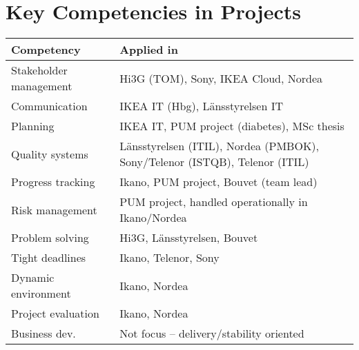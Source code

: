 \section{Key Competencies in Projects}
{\small\sffamily
\begin{tabular}{p{5cm} p{9cm}}
\textbf{Competency} & \textbf{Applied in} \\ \hline
Stakeholder management & Hi3G (TOM), Sony, IKEA Cloud, Nordea \\
Communication & IKEA IT (Hbg), Länsstyrelsen IT \\
Planning & IKEA IT, PUM project (diabetes), MSc thesis \\
Quality systems & Länsstyrelsen (ITIL), Nordea (PMBOK), Sony/Telenor (ISTQB), Telenor (ITIL) \\
Progress tracking & Ikano, PUM project, Bouvet (team lead) \\
Risk management & PUM project, handled operationally in Ikano/Nordea \\
Problem solving & Hi3G, Länsstyrelsen, Bouvet \\
Tight deadlines & Ikano, Telenor, Sony \\
Dynamic environment & Ikano, Nordea \\
Project evaluation & Ikano, Nordea \\
Business dev. & Not focus – delivery/stability oriented \\
\end{tabular}
}
\normalsize
